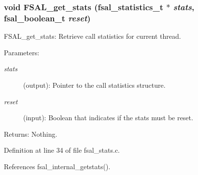 \subsubsection{\setlength{\rightskip}{0pt plus 5cm}void FSAL\_\-get\_\-stats (fsal\_\-statistics\_\-t $\ast$ {\em stats}, fsal\_\-boolean\_\-t {\em reset})}\label{fsal__stats_8c_a0}


FSAL\_\-get\_\-stats: Retrieve call statistics for current thread.

\begin{Desc}
\item[Parameters:]
\begin{description}
\item[{\em stats}](output): Pointer to the call statistics structure. \item[{\em reset}](input): Boolean that indicates if the stats must be reset.\end{description}
\end{Desc}
\begin{Desc}
\item[Returns:]Nothing. \end{Desc}


Definition at line 34 of file fsal\_\-stats.c.

References fsal\_\-internal\_\-getstats().